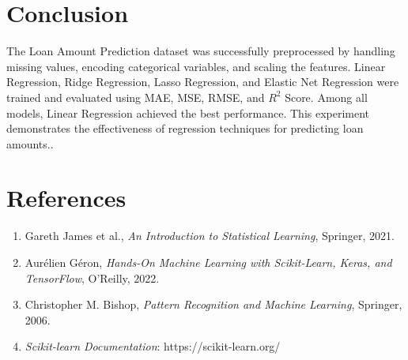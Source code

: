 \documentclass{article}
\begin{document}
\section{Conclusion}

The Loan Amount Prediction dataset was successfully preprocessed by handling missing values, encoding categorical variables, and scaling the features. Linear Regression, Ridge Regression, Lasso Regression, and Elastic Net Regression were trained and evaluated using MAE, MSE, RMSE, and $R^2$ Score. Among all models, Linear Regression achieved the best performance. This experiment demonstrates the effectiveness of regression techniques for predicting loan amounts..

\section{References}

\begin{enumerate}
    \item Gareth James et al., \textit{An Introduction to Statistical Learning}, Springer, 2021.
    \item Aurélien Géron, \textit{Hands-On Machine Learning with Scikit-Learn, Keras, and TensorFlow}, O'Reilly, 2022.
    \item Christopher M. Bishop, \textit{Pattern Recognition and Machine Learning}, Springer, 2006.
    \item \textit{Scikit-learn Documentation}: https://scikit-learn.org/
    
\end{enumerate}
\end{document}
